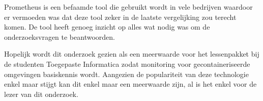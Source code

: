 Prometheus is een befaamde tool die gebruikt wordt in vele bedrijven waardoor er vermoeden was dat deze tool zeker in de laatste vergelijking zou terecht komen. De tool heeft genoeg inzicht op alles wat nodig was om de onderzoeksvragen te beantwoorden.

Hopelijk wordt dit onderzoek gezien als een meerwaarde voor het lessenpakket bij de studenten Toegepaste Informatica zodat monitoring voor gecontaineriseerde omgevingen basiskennis wordt. Aangezien de populariteit van deze technologie enkel maar stijgt kan dit enkel maar een meerwaarde zijn, al is het enkel voor de lezer van dit onderzoek.



